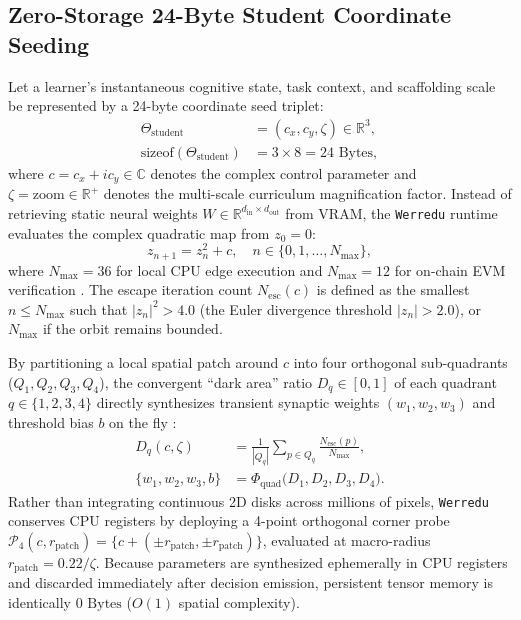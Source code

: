 \documentclass[10pt,twocolumn,a4paper]{article}
\begin{document}
\subsection{Zero-Storage 24-Byte Student Coordinate Seeding}
Let a learner's instantaneous cognitive state, task context, and scaffolding scale be represented by a 24-byte coordinate seed triplet:
\begin{align}
    \Theta_{\text{student}} &= (c_x, c_y, \zeta) \in \mathbb{R}^3, \label{eq:seed} \\
    \text{sizeof}(\Theta_{\text{student}}) &= 3 \times 8 = 24\text{ Bytes}, \nonumber
\end{align}
where $c = c_x + i c_y \in \mathbb{C}$ denotes the complex control parameter and $\zeta = \text{zoom} \in \mathbb{R}^+$ denotes the multi-scale curriculum magnification factor. Instead of retrieving static neural weights $W \in \mathbb{R}^{d_{\text{in}} \times d_{\text{out}}}$ from VRAM, the \texttt{Werredu} runtime evaluates the complex quadratic map from $z_0 = 0$:
\begin{equation}
    z_{n+1} = z_n^2 + c, \quad n \in \{0, 1, \dots, N_{\max}\},
    \label{eq:mandelbrot}
\end{equation}
where $N_{\max} = 36$ for local CPU edge execution and $N_{\max} = 12$ for on-chain EVM verification \cite{dagli2026lean4}. The escape iteration count $N_{\text{esc}}(c)$ is defined as the smallest $n \le N_{\max}$ such that $|z_n|^2 > 4.0$ (the Euler divergence threshold $|z_n| > 2.0$), or $N_{\max}$ if the orbit remains bounded.

By partitioning a local spatial patch around $c$ into four orthogonal sub-quadrants ($Q_1, Q_2, Q_3, Q_4$), the convergent ``dark area'' ratio $D_q \in [0, 1]$ of each quadrant $q \in \{1,2,3,4\}$ directly synthesizes transient synaptic weights $(w_1, w_2, w_3)$ and threshold bias $b$ on the fly \cite{dagli2026mandelbrot}:
\begin{align}
    D_q(c, \zeta) &= \frac{1}{|Q_q|} \sum_{p \in Q_q} \frac{N_{\text{esc}}(p)}{N_{\max}}, \label{eq:dark_area} \\
    \{w_1, w_2, w_3, b\} &= \Phi_{\text{quad}}\big(D_1, D_2, D_3, D_4\big). \nonumber
\end{align}
Rather than integrating continuous 2D disks across millions of pixels, \texttt{Werredu} conserves CPU registers by deploying a 4-point orthogonal corner probe $\mathcal{P}_4(c, r_{\text{patch}}) = \{c + (\pm r_{\text{patch}}, \pm r_{\text{patch}})\}$, evaluated at macro-radius $r_{\text{patch}} = 0.22 / \zeta$. Because parameters are synthesized ephemerally in CPU registers and discarded immediately after decision emission, persistent tensor memory is identically $0\text{ Bytes}$ ($O(1)$ spatial complexity).
\end{document}
